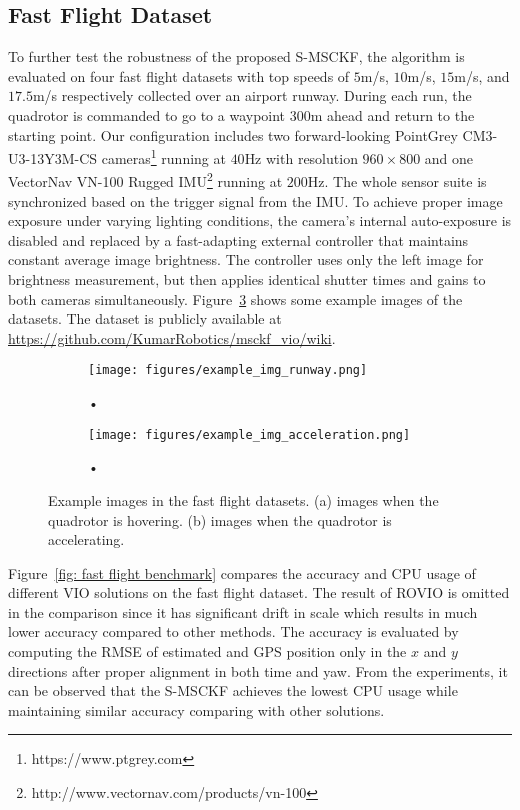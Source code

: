 \subsection{Fast Flight Dataset}
\label{subsec: fast flight dataset}
To further test the robustness of the proposed S-MSCKF, the algorithm is evaluated on four fast flight datasets with top speeds of $5$m/s, $10$m/s, $15$m/s, and $17.5$m/s respectively collected over an airport runway. During each run, the quadrotor is commanded to go to a waypoint $300$m ahead and return to the starting point. Our configuration includes two forward-looking PointGrey CM3-U3-13Y3M-CS cameras\footnote{https://www.ptgrey.com} running at $40$Hz with resolution $960\times 800$ and one VectorNav VN-100 Rugged IMU\footnote{http://www.vectornav.com/products/vn-100} running at $200$Hz. The whole sensor suite is synchronized based on the trigger signal from the IMU. To achieve proper image exposure under varying lighting conditions, the camera's internal auto-exposure is disabled and replaced by a fast-adapting external controller that maintains constant average image brightness. The controller uses only the left image for brightness measurement, but then applies identical shutter times and gains to both cameras simultaneously. Figure~\ref{fig: fast flight example img} shows some example images of the datasets. The dataset is publicly available at \url{https://github.com/KumarRobotics/msckf_vio/wiki}.

\begin{figure}[t]
\centering
\begin{subfigure}[b]{0.23\textwidth}
\texttt{[image: figures/example\_img\_runway.png]}
\caption{•}
\label{fig: fast flight example img runway}
\end{subfigure}
\begin{subfigure}[b]{0.23\textwidth}
\texttt{[image: figures/example\_img\_acceleration.png]}
\caption{•}
\label{fig: fast flight example img acceleration}
\end{subfigure}
\caption{Example images in the fast flight datasets. (a) images when the quadrotor is hovering. (b) images when the quadrotor is accelerating.}
\label{fig: fast flight example img}
\end{figure}

Figure~\ref{fig: fast flight benchmark} compares the accuracy and CPU usage of different VIO solutions on the fast flight dataset. The result of ROVIO is omitted in the comparison since it has significant drift in scale which results in much lower accuracy compared to other methods. The accuracy is evaluated by computing the RMSE of estimated and GPS position only in the $x$ and $y$ directions after proper alignment in both time and yaw. From the experiments, it can be observed that the S-MSCKF achieves the lowest CPU usage while maintaining similar accuracy comparing with other solutions. 

